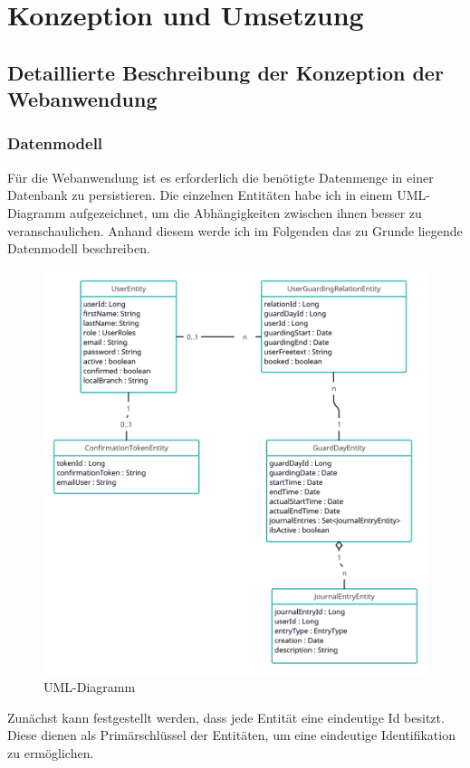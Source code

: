 \documentclass[fontsize=12pt,openright,oneside,paper=a4,BCOR=1cm]{scrbook}
\begin{document}
%
%

\renewcommand{\cleardoublepage}{}
\chapter{Konzeption und Umsetzung}

\section{Detaillierte Beschreibung der Konzeption der Webanwendung}

\subsection{Datenmodell}

Für die Webanwendung ist es erforderlich die benötigte Datenmenge in einer Datenbank zu persistieren. Die einzelnen Entitäten habe ich in einem UML-Diagramm aufgezeichnet, um die Abhängigkeiten zwischen ihnen besser zu veranschaulichen. Anhand diesem werde ich im Folgenden das zu Grunde liegende Datenmodell beschreiben.

\begin{figure}[H]
  \centering
  \includegraphics[width=0.6\linewidth]{Anlagen/umlDiagramm.png} 
  \caption{UML-Diagramm}
  \label{fig:anmeldeprozess}
\end{figure}

Zunächst kann festgestellt werden, dass jede Entität eine eindeutige Id besitzt. Diese dienen als Primärschlüssel der Entitäten, um eine eindeutige Identifikation zu ermöglichen.
\end{document}
